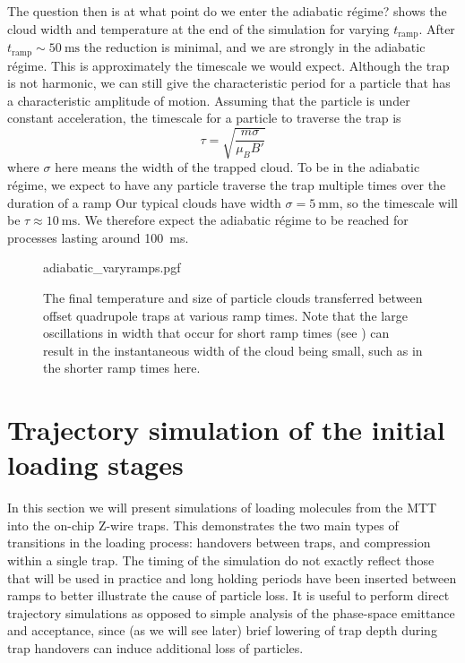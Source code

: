 The question then is at what point do we enter the adiabatic r\'egime?
 shows the cloud width and temperature at the end
of the simulation for varying $t_\text{ramp}$. After
$t_\text{ramp}\sim\SI{50}{\milli\second}$ the reduction is minimal, and we are
strongly in the adiabatic r\'egime. This is approximately the timescale we
would expect. Although the trap is not harmonic, we can still give the
characteristic period for a particle that has a characteristic amplitude of
motion. Assuming that the particle is under constant acceleration, the
timescale for a particle to traverse the trap is
%
\begin{equation}
  \tau = \sqrt{\frac{m \sigma}{\mu_B B'}}
\end{equation}
%
where $\sigma$ here means the width of the trapped cloud. To be in the
adiabatic r\'egime, we expect to have any particle traverse the trap multiple
times over the duration of a ramp Our typical \CaF{}
clouds
have width $\sigma = \SI{5}{\milli\meter}$, so the timescale will be $\tau
\approx \SI{10}{\milli\second}$. We therefore expect the adiabatic r\'egime to
be reached for processes lasting around \SI{100}{\milli\second}.

\begin{figure}[t!]
\centering
  {adiabatic_varyramps.pgf}
  \caption{
    The final temperature and size of particle clouds transferred between
    offset quadrupole traps at various ramp times. Note that the large
    oscillations in width that occur for short ramp times (see
    ) can result in the instantaneous width of
    the cloud being small, such as in the shorter ramp times here.
  }
  \label{design:fig:adiavary}
\end{figure}


\section{Trajectory simulation of the initial loading stages}

In this section we will present simulations of loading molecules from the MTT
into the on-chip Z-wire traps. 
This demonstrates
the two main types of transitions in the loading process: handovers between
traps, and compression within a single trap. The timing of the simulation do
not exactly reflect those that will be used in practice and long holding periods
have been inserted between ramps to better illustrate the cause of particle
loss. It is useful to perform direct trajectory simulations as opposed to
simple analysis of the phase-space emittance and acceptance, since (as we will
see later) brief lowering of trap depth during trap handovers can induce
additional loss of particles.

